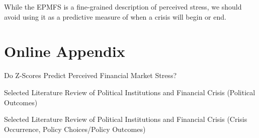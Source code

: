 \documentclass[]{article}
\begin{document}
While the EPMFS is a fine-grained description of perceived stress, we should avoid using it as a predictive measure of when a crisis will begin or end.




\clearpage

\section*{Online Appendix}


\begin{table}
    \caption{Do Z-Scores Predict Perceived Financial Market Stress?}
    \label{epfms_z_regress}

    \begin{center}
        
    \end{center}
\end{table}



\begin{table}[H]
\caption{Selected Literature Review of Political Institutions and Financial
Crisis (Political Outcomes)}


\label{LitRevTable2}
\begin{center}

\vspace{0.5cm}
\scalebox{0.9}{

}
\end{center}
\end{table}

\begin{table}[H]
\caption{Selected Literature Review of Political Institutions and Financial
Crisis (Crisis Occurrence, Policy Choices/Policy Outcomes)}


\label{LitRevTable}
\begin{center}

\vspace{0.5cm}
{\tiny{

}}
\end{center}
\end{table}
\end{document}
